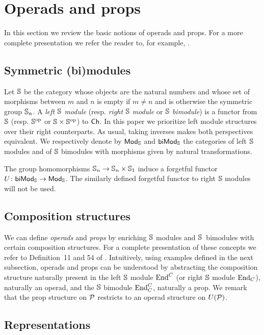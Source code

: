 
\section{Operads and props} \label{s:operads and props}

In this section we review the basic notions of operads and props.
For a more complete presentation we refer the reader to, for example, \cite{Markl08}.

\subsection{Symmetric (bi)modules}

Let $\S$ be the category whose objects are the natural numbers and whose set of morphisms between $m$ and $n$ is empty if $m \neq n$ and is otherwise the symmetric group $\S_n$.
A \textit{left $\S$ module} (resp. \textit{right} $\S$ \textit{module} or $\S$ \textit{bimodule}) is a functor from $\S$ (resp. $\S^\op$ or $\S \times \S^\op$) to $\Ch$.
In this paper we prioritize left module structures over their right counterparts. As usual, taking inverses makes both perspectives equivalent.
We respectively denote by $\smod$ and $\sbimod$ the categories of left $\S$ modules and of $\S$ bimodules with morphisms given by natural transformations.

The group homomorphisms $\S_n \to \S_n \times \S_1$ induce a forgetful functor $U \colon \sbimod \to \smod$.
The similarly defined forgetful functor to right $\S$ modules will not be used.

\subsection{Composition structures}

We can define \textit{operads} and \textit{props} by enriching $\S$ modules and \mbox{$\S$ bimodules} with certain composition structures.
For a complete presentation of these concepts we refer to Definition~11 and 54 of \cite{Markl08}.
Intuitively, using examples defined in the next subsection, operads and props can be understood by abstracting the composition structure naturally present in the left $\S$ module $\End^C$ (or right $\S$ module $\End_C$), naturally an operad, and the $\S$ bimodule $\End^C_C$, naturally a prop.
We remark that the prop structure on $\P$ restricts to an operad structure on $U(\P)$.

\subsection{Representations}

